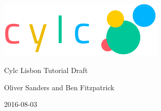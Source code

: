 \thispagestyle{empty}

\begin{titlepage}
    \begin{center}
        \includegraphics[width=0.6\textwidth]{resources/tex/cylc-logo}

        \Huge{Cylc Lisbon Tutorial Draft}

        \large{Oliver Sanders and Ben Fitzpatrick}

        \small{2016-08-03}
    \end{center}

\vspace{1cm}

\tableofcontents
\end{titlepage}
